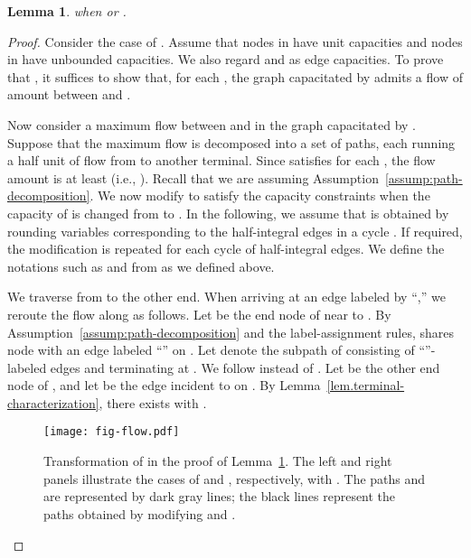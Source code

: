 \documentclass{article}
\newtheorem{lemma}{Lemma}
\begin{document}
\begin{lemma}\label{lem.feasibility}
  when  or .
\end{lemma}
\begin{proof}
Consider the case of .
Assume that 
nodes in  have unit capacities
and nodes in  have unbounded capacities.
We also regard 
 and  as edge capacities.
To prove that , 
it suffices to show that, for each ,
the graph capacitated by  admits
a flow of amount 
between  and .

Now consider a maximum flow between  and 
in the graph capacitated by .
Suppose that the maximum flow is decomposed into a set 
 of paths, each running a half unit of flow from  to another terminal.
Since  satisfies 
for each ,
the flow amount is at least  (i.e., ).
Recall that we are assuming Assumption~\ref{assump:path-decomposition}.
We now modify  to satisfy the capacity constraints when 
the capacity of  is changed from  to .
In the following, we assume that  is obtained by rounding variables corresponding to 
the half-integral edges in a cycle . If required, the modification is repeated for each cycle
of half-integral edges.
We define the notations such as  and 
 from  as we defined above.


We traverse  from  to the other end.
When arriving at an edge  labeled by ``,''
we reroute the flow along  as follows.
Let  be the end node of  near to .
By Assumption~\ref{assump:path-decomposition} and the label-assignment rules,
 shares node  with an edge labeled ``'' on .
Let  denote the subpath of  consisting of ``''-labeled edges and terminating at .
We follow  instead of .
Let  be the other end node of ,
and let  be the edge incident to  on .
By Lemma~\ref{lem.terminal-characterization}, there exists  with .

\begin{figure}
\centering
\texttt{[image: fig-flow.pdf]}
\caption{Transformation of  in the proof of Lemma~\ref{lem.feasibility}. The left and right
panels illustrate the cases of  and , respectively, with . The paths  and  are represented by dark gray lines;
the black lines represent the paths obtained by modifying  and .}
\label{fig.flow-transformation}
\end{figure}



\end{proof}
\end{document}
